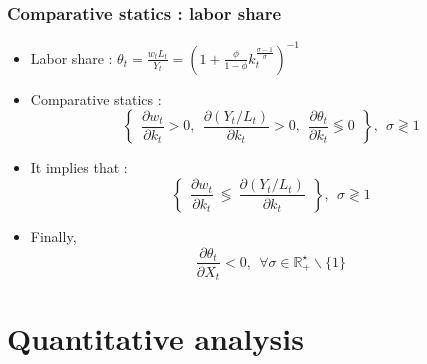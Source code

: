 \documentclass{beamer}
\begin{document}
			\begin{frame}\frametitle{Comparative statics : labor share}
					\begin{itemize}
						\item Labor share : $\theta_t = \frac{w_t L_t}{Y_t}=  \left(1+\frac{\phi}{1-\phi}k_t^{\frac{\sigma-1}{\sigma}}\right)^{-1}$
						\item Comparative statics :
						\begin{equation*}
							\left\lbrace ~~
							\frac{\partial w_t}{\partial k_t} > 0,~~
							\frac{\partial (Y_t/L_t)}{\partial k_t} > 0,~~
							\frac{\partial \theta_t}{\partial k_t} \lessgtr 0 ~~
							\right\rbrace, ~~ \sigma \gtrless 1
						\end{equation*}
						\item It implies that :
						\begin{equation*}
							\left\lbrace ~~
							\frac{\partial w_t}{\partial k_t} ~\lessgtr~ \frac{\partial (Y_t/L_t)}{\partial k_t} ~~
							\right\rbrace, ~~ \sigma \gtrless 1
						\end{equation*}
						\item Finally,
						\begin{equation*}
							\frac{\partial \theta_t}{\partial X_t} < 0,~~ \forall \sigma \in \mathbb{R}^\star_+ \smallsetminus\lbrace 1 \rbrace
						\end{equation*}
					\end{itemize}
			\end{frame}
	
	\section{Quantitative analysis}
\end{document}
